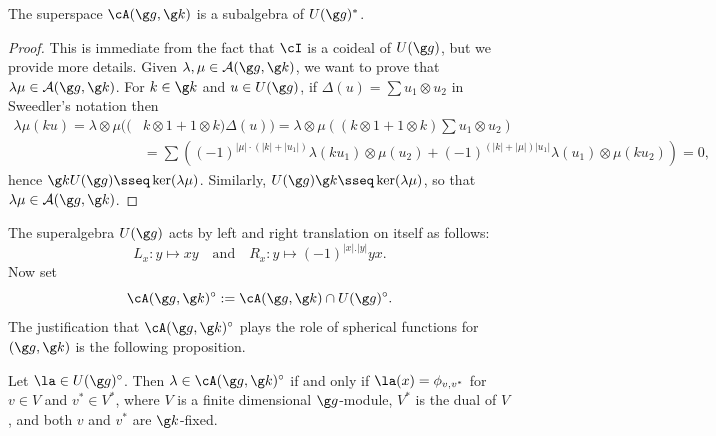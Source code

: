 \documentclass[11pt]{amsart}
\begin{document}
\begin{lem}
The superspace $\cA(\g g,\g k)$ is a subalgebra of $U(\g g)^*$. 
\end{lem}
\begin{proof}
This is immediate from the fact that $\cI$ is a coideal of $U(\g g)$, but we provide more details. Given $ \lambda, \mu \in \mathcal A(\g g,\g k) $, we want to prove that $ \lambda\mu\in \mathcal A(\g g,\g k) $. For $ k\in \g k $ and $ u\in U(\g g) $, if $\Delta(u)=\sum u_1\otimes u_2$ in Sweedler's notation then 
\begin{align*}
\lambda \mu (ku)=\lambda\otimes \mu ( (&k\otimes 1+1\otimes k)\Delta(u) )=\lambda\otimes \mu \left( \left(k\otimes 1+1\otimes k\right)\sum u_1 \otimes u_2\right)\\&=\sum \left(
(-1)^{|\mu|\cdot(|k|+|u_1|)}
\lambda \left(ku_1\right)\otimes \mu \left(u_2\right)+(-1)^{(|k|+|\mu|) |u_1|
}\lambda \left(u_1\right)\otimes \mu \left(ku_2\right)\right)=0,
\end{align*}
hence $\g kU(\g g)\sseq \ker(\lambda\mu)$. Similarly, 
$U(\g g)\g k\sseq \ker (\lambda\mu)$, so that 
$\lambda\mu\in \mathcal A(\g g,\g k)$. 
\end{proof}
The superalgebra $U(\g g)$ acts by left and right translation on itself  as follows:
\begin{equation}
\label{eq:LxRxdf} L_x:y\mapsto xy \quad \text{and}\quad R_x:y\mapsto (-1)^{|x|.|y|}yx.
\end{equation}
Now set 
\[
\cA(\g g,\g k)^\circ:=\cA(\g g, \g k)\cap U(\g g)^\circ.
\] 
The justification that $\cA(\g g,\g k)^\circ$ plays the role of spherical functions for $(\g g,\g k)$ is the following proposition. 
\begin{prp}\label{rols-of-spherical}
	Let $\la\in 
U(\g g)^\circ$. Then $\lambda\in	
	\cA(\g g,\g k)^\circ$ if and only if  
	$\la(x)=\phi_{v,v^*}$ for $v\in V$ and $v^*\in V^*$, where $V$ is a finite dimensional $\g g$-module, $V^*$ is the dual of $V$, and both $v$ and $v^*$ are $\g k$-fixed. 
\end{prp}
\end{document}
